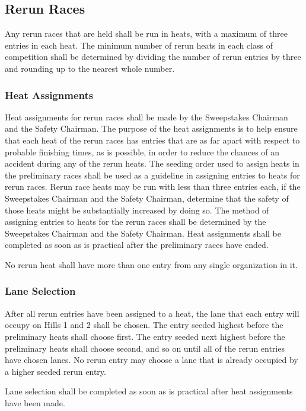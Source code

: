 \documentclass[openany]{book}
\begin{document}
\subsection{Rerun Races}
Any rerun races that are held shall be run in heats, with a maximum of three entries in each heat. The minimum number of rerun heats in each class of competition shall be determined by dividing the number of rerun entries by three and rounding up to the nearest whole number.

\subsubsection{Heat Assignments}

Heat assignments for rerun races shall be made by the Sweepstakes Chairman and the Safety Chairman. The purpose of the heat assignments is to help ensure that each heat of the rerun races has entries that are as far apart with respect to probable finishing times, as is possible, in order to reduce the chances of an accident during any of the rerun heats. The seeding order used to assign heats in the preliminary races shall be used as a guideline in assigning entries to heats for rerun races. Rerun race heats may be run with less than three entries each, if the Sweepstakes Chairman and the Safety Chairman, determine that the safety of those heats might be substantially increased by doing so. The method of assigning entries to heats for the rerun races shall be determined by the Sweepstakes Chairman and the Safety Chairman. Heat assignments shall be completed as soon as is practical after the preliminary races have ended.

No rerun heat shall have more than one entry from any single organization in it.

\subsubsection{Lane Selection}
After all rerun entries have been assigned to a heat, the lane that each entry will occupy on Hills 1 and 2 shall be chosen. The entry seeded highest before the preliminary heats shall choose first. The entry seeded next highest before the preliminary heats shall choose second, and so on until all of the rerun entries have chosen lanes. No rerun entry may choose a lane that is already occupied by a higher seeded rerun entry.

Lane selection shall be completed as soon as is practical after heat assignments have been made.
\end{document}
